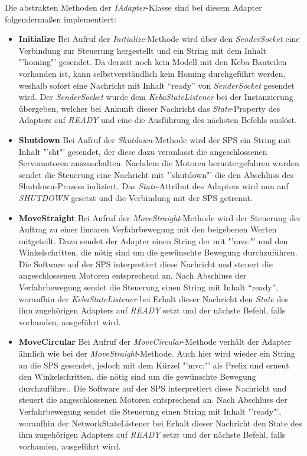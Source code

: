 Die abstrakten Methoden der \textit{IAdapter}-Klasse sind bei diesem Adapter folgendermaßen implementiert:
\begin{itemize}
\item \textbf{Initialize}
\newline
Bei Aufruf der \textit{Initialize}-Methode wird über den \textit{SenderSocket} eine Verbindung zur Steuerung hergestellt und ein String mit dem Inhalt "'homing"' gesendet. Da derzeit noch kein Modell mit den Keba-Bauteilen vorhanden ist, kann selbstverständlich kein Homing durchgeführt werden, weshalb sofort eine Nachricht mit Inhalt “ready” von \textit{SenderSocket} gesendet wird. Der \textit{SenderSocket} wurde dem \textit{KebaStateListener} bei der Instanzierung übergeben, welcher bei Ankunft dieser Nachricht das \textit{State}-Property des Adapters auf \textit{READY} und eine die Ausführung des nächsten Befehls auslöst.
\item \textbf{Shutdown}
\newline
Bei Aufruf der \textit{Shutdown}-Methode wird der SPS ein String mit Inhalt "'sht"' gesendet, der diese dazu veranlasst die angeschlossenen Servomotoren auszuschalten. Nachdem die Motoren heruntergefahren wurden sendet die Steuerung eine Nachricht mit "'shutdown"' die den Abschluss des Shutdown-Prozess indiziert. Das \textit{State}-Attribut des Adapters wird nun auf \textit{SHUTDOWN} gesetzt und die Verbindung mit der SPS getrennt.
\item \textbf{MoveStraight}
\newline
Bei Aufruf der \textit{MoveStraight}-Methode wird der Steuerung der Auftrag zu einer linearen Verfahrbewegung mit den beigebenen Werten mitgeteilt. Dazu sendet der Adapter einen String der mit "'mvs:"' und den Winkelschritten, die nötig sind um die gewünschte Bewegung durchzuführen. Die Software auf der SPS interpretiert diese Nachricht und steuert die angeschlossenen Motoren entsprechend an. Nach Abschluss der Verfahrbewegung sendet die Steuerung einen String mit Inhalt “ready”, woraufhin der \textit{KebaStateListener} bei Erhalt dieser Nachricht den \textit{State} des ihm zugehörigen Adapters auf \textit{READY} setzt und der nächste Befehl, falls vorhanden, ausgeführt wird.
\item \textbf{MoveCircular}
\newline
Bei Aufruf der \textit{MoveCircular}-Methode verhält der Adapter ähnlich wie bei der \textit{MoveStraight}-Methode. Auch hier wird wieder ein String an die SPS gesendet, jedoch mit dem Kürzel "'mvc:"' als Prefix und erneut den Winkelschritten, die nötig sind um die gewünschte Bewegung durchzuführe.. Die Software auf der SPS interpretiert diese Nachricht und steuert die angeschlossenen Motoren entsprechend an.  Nach Abschluss der Verfahrbewegung sendet die Steuerung einen String mit Inhalt "'ready"', woraufhin der NetworkStateListener bei Erhalt dieser Nachricht den State des ihm zugehörigen Adapters auf \textit{READY} setzt und der nächste Befehl, falls vorhanden, ausgeführt wird.

\end{itemize}
